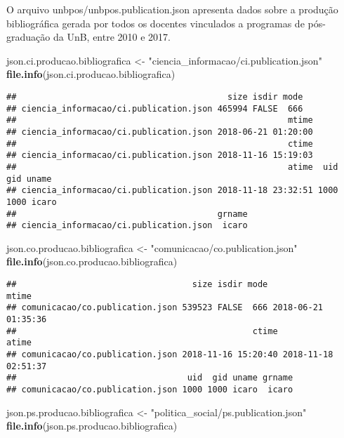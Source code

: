 \documentclass[]{article}
\newenvironment{Shaded}{\begin{snugshade}}{\end{snugshade}}
\newcommand{\KeywordTok}[1]{\textcolor[rgb]{0.13,0.29,0.53}{\textbf{#1}}}
\newcommand{\StringTok}[1]{\textcolor[rgb]{0.31,0.60,0.02}{#1}}
\newcommand{\NormalTok}[1]{#1}
\begin{document}
O arquivo unbpos/unbpos.publication.json apresenta dados sobre a
produção bibliográfica gerada por todos os docentes vinculados a
programas de pós-graduação da UnB, entre 2010 e 2017.

\begin{Shaded}
\begin{Highlighting}[]
\NormalTok{json.ci.producao.bibliografica <-}\StringTok{ "ciencia_informacao/ci.publication.json"}
\KeywordTok{file.info}\NormalTok{(json.ci.producao.bibliografica)}
\end{Highlighting}
\end{Shaded}

\begin{verbatim}
##                                          size isdir mode
## ciencia_informacao/ci.publication.json 465994 FALSE  666
##                                                      mtime
## ciencia_informacao/ci.publication.json 2018-06-21 01:20:00
##                                                      ctime
## ciencia_informacao/ci.publication.json 2018-11-16 15:19:03
##                                                      atime  uid  gid uname
## ciencia_informacao/ci.publication.json 2018-11-18 23:32:51 1000 1000 icaro
##                                        grname
## ciencia_informacao/ci.publication.json  icaro
\end{verbatim}

\begin{Shaded}
\begin{Highlighting}[]
\NormalTok{json.co.producao.bibliografica <-}\StringTok{ "comunicacao/co.publication.json"}
\KeywordTok{file.info}\NormalTok{(json.co.producao.bibliografica)}
\end{Highlighting}
\end{Shaded}

\begin{verbatim}
##                                   size isdir mode               mtime
## comunicacao/co.publication.json 539523 FALSE  666 2018-06-21 01:35:36
##                                               ctime               atime
## comunicacao/co.publication.json 2018-11-16 15:20:40 2018-11-18 02:51:37
##                                  uid  gid uname grname
## comunicacao/co.publication.json 1000 1000 icaro  icaro
\end{verbatim}

\begin{Shaded}
\begin{Highlighting}[]
\NormalTok{json.ps.producao.bibliografica <-}\StringTok{ "politica_social/ps.publication.json"}
\KeywordTok{file.info}\NormalTok{(json.ps.producao.bibliografica)}
\end{Highlighting}
\end{Shaded}
\end{document}
